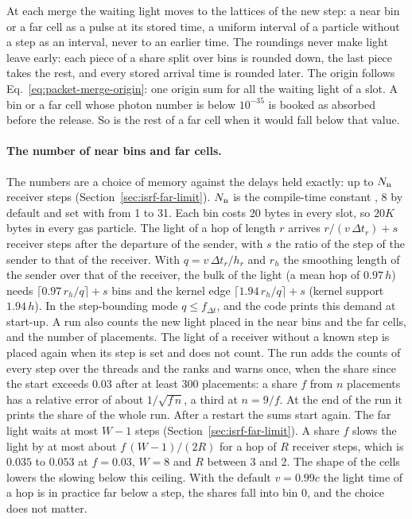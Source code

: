 At each merge the waiting light moves to the lattices of the new step: a near
bin or a far cell as a pulse at its stored time, a uniform interval of a particle without
a step as an interval, never to an earlier time. The roundings never make light
leave early: each piece of a share split
over bins is rounded down, the last piece takes the rest, and every stored
arrival time is rounded later. The
origin follows
Eq.~\eqref{eq:packet-merge-origin}: one origin sum for all the waiting light
of a slot. A bin or a far cell whose photon number is below $10^{-35}$ is
booked as absorbed before the release. So is the rest of a far cell when it
would fall below that value.

\paragraph{The number of near bins and far cells.} The numbers are a choice of
memory against the delays held exactly: up to $N_{\rm n}$ receiver steps
(Section~\ref{sec:isrf-far-limit}). $N_{\rm n}$ is the compile-time constant
, 8 by default and set with
 from 1 to 31. Each bin costs 20
bytes in every slot, so $20K$ bytes in every gas particle. The
light of a hop of length $r$ arrives $r/(v\,\Delta t_r)+s$ receiver steps after
the departure of the sender, with $s$ the ratio of the step of the sender to
that of the receiver. With $q=v\,\Delta t_r/h_r$ and $r_h$ the smoothing length
of the sender over that of the receiver, the bulk of the light (a mean hop of
$0.97\,h$) needs $\lceil 0.97\,r_h/q\rceil+s$ bins and the kernel edge
$\lceil 1.94\,r_h/q\rceil+s$ (kernel support $1.94\,h$). In the step-bounding mode $q\le
f_{\Delta t}$, and the code prints this demand at start-up. A run also
counts the new light placed in the near bins and the far cells, and the number
of placements. The light of a receiver without a known step is placed again
when its step is set and does not count. The run adds the counts of every step
over the threads and the ranks and warns once, when the share since the start
exceeds $0.03$ after at least 300 placements: a share $f$ from $n$ placements
has a relative error of about $1/\sqrt{f\,n}$, a third at $n=9/f$. At the end
of the run it prints the share of the whole run. After a restart the
sums start again. The far light waits at most $W-1$ steps
(Section~\ref{sec:isrf-far-limit}). A share
$f$ slows the light by at most about $f\,(W-1)/(2R)$ for a hop of $R$ receiver steps,
which is $0.035$ to $0.053$ at $f=0.03$, $W=8$ and $R$ between 3 and 2. The shape
of the cells lowers the slowing below this ceiling. With the default $v=0.99c$ the light time
of a hop is in practice far below a step, the shares fall into bin $0$, and the
choice does not matter.

